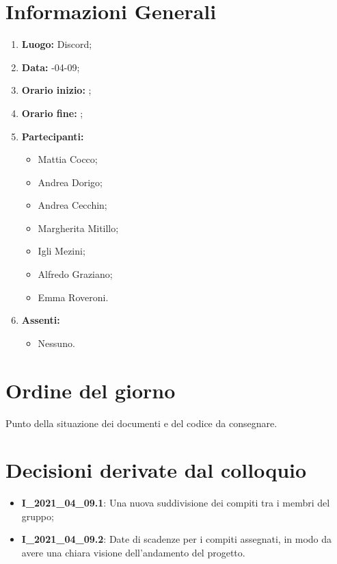 \newpage
\section{Informazioni Generali}
\begin{enumerate}
	\item \textbf{Luogo:} \normalfont  Discord;
	\item \textbf{Data:} -04-09;
	\item \textbf{Orario inizio:} ;
	\item \textbf{Orario fine:} ;
	\item \textbf{Partecipanti:}
	\begin{itemize}
		\item Mattia Cocco;
		\item Andrea Dorigo;
		\item Andrea Cecchin;
		\item Margherita Mitillo;
		\item Igli Mezini;
		\item Alfredo Graziano;
		\item Emma Roveroni.
	\end{itemize}
	\item \textbf{Assenti:}
	\begin{itemize}
		\item Nessuno.
	\end{itemize}
\end{enumerate}
\section{Ordine del giorno}
Punto della situazione dei documenti e del codice da consegnare.

\section{Decisioni derivate dal colloquio}
\begin{itemize}
	\item \textbf{I\_2021\_04\_09.1}: Una nuova suddivisione dei compiti tra i membri del gruppo;
\end{itemize}
\begin{itemize}
	\item \textbf{I\_2021\_04\_09.2}: Date di scadenze per i compiti assegnati, in modo da avere una chiara visione dell'andamento del progetto.
\end{itemize}